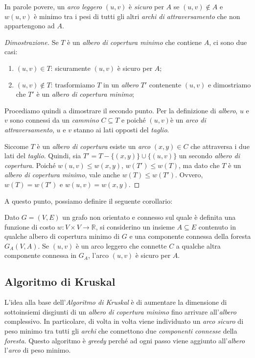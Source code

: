 \noindent
In parole povere, un \emph{arco leggero} $(u,v)$ è \emph{sicuro} per $A$ se
$(u,v)\notin A$ e $w(u, v)$ è minimo tra i pesi di tutti gli altri \emph{archi
di attraversamento} che non appartengono ad $A$.

\begin{proof}[Dimostrazione]
    Se $T$ è un \emph{albero di copertura minimo} che contiene $A$, ci sono due
    casi:
    \begin{enumerate}
        \item $(u,v)\in T$: sicuramente $(u,v)$ è sicuro per $A$;
        \item $(u,v)\notin T$: trasformiamo $T$ in un \emph{albero} $T'$
        contenente $(u,v)$ e dimostriamo che $T'$ è un \emph{albero di copertura
        minimo};
    \end{enumerate}
    Procediamo quindi a dimostrare il secondo punto. Per la definizione di
    \emph{albero}, $u$ e $v$ sono connessi da un \emph{cammino} $C\subseteq T$ e
    poiché $(u,v)$è un \emph{arco di attraversamento}, $u$ e $v$ stanno ai lati
    opposti del \emph{taglio}.
    
    Siccome $T$ è un \emph{albero di copertura} esiste un \emph{arco} $(x,y)\in C$
    che attraversa i due lati del \emph{taglio}. Quindi, sia $T'=T-\{(x,y)\}
    \cup\{(u,v)\}$ un secondo \emph{albero di copertura}. Poiché $w(u,v)\leq
    w(x,y)$, $w(T')\leq w(T)$, ma dato che $T$ è un \emph{albero di copertura
    minimo}, vale anche $w(T)\leq w(T')$. Ovvero, $w(T)=w(T')$ e $w(u,v)=w(x,y)$.
\end{proof}

\noindent
A questo punto, possiamo definire il seguente corollario:
\begin{definition}[Corollario]
    Dato $G=(V,E)$ un grafo non orientato e connesso sul quale è definita una
    funzione di costo $w:V\times V\to\mathbb{R}$, si considerino un insieme
    $A\subseteq E$ contenuto in qualche albero di copertura minimo di $G$ e una
    componente connessa della foresta $G_A(V,A)$. Se $(u,v)$ è un arco leggero
    che connette $C$ a qualche altra componente connessa in $G_A$, l'arco $(u,v)$
    è sicuro per $A$.
\end{definition}

\subsection{Algoritmo di Kruskal}
L'idea alla base dell'\emph{Algoritmo di Kruskal} è di aumentare la dimensione
di sottoinsiemi disgiunti di un \emph{albero di copertura minimo} fino arrivare
all'\emph{albero} complessivo. In particolare, di volta in volta viene individuato
un \emph{arco sicuro} di peso minimo tra tutti gli \emph{archi} che connettono
due \emph{componenti connesse} della \emph{foresta}. Questo algoritmo è
\emph{greedy} perché ad ogni passo viene aggiunto all'\emph{albero} l'\emph{arco}
di peso minimo.

